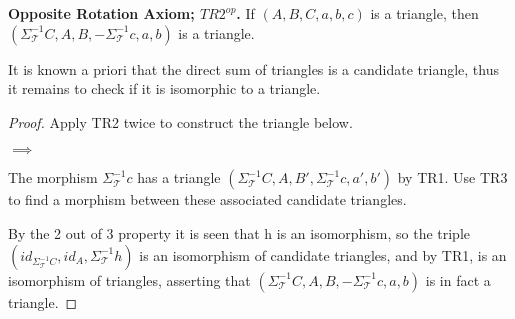     \begin{lemma} \textbf{Opposite Rotation Axiom; $TR2^{op}$.}
        If $(A,B,C,a,b,c)$ is a triangle, then $(\Sigma_{\mathcal{T}}^{-1}C,A,B,-\Sigma_{\mathcal{T}}^{-1}c,a,b)$ is a triangle.
    \end{lemma}

    \begin{remark}
        It is known a priori that the direct sum of triangles is a candidate triangle, thus it remains to check if it is isomorphic to a triangle.
    \end{remark}

    \begin{proof}
        Apply TR2 twice to construct the triangle below.
        \begin{center}
            $\implies$
        \end{center}
        The morphism $\Sigma_{\mathcal{T}}^{-1}c$ has a triangle $(\Sigma_{\mathcal{T}}^{-1}C,A,B',\Sigma_{\mathcal{T}}^{-1}c,a',b')$ by TR1. Use TR3 to find a morphism between these associated candidate triangles.
        \begin{center}
        \end{center}
        By the 2 out of 3 property it is seen that h is an isomorphism, so the triple $(id_{\Sigma_{\mathcal{T}}^{-1}C}, id_A, \Sigma_{\mathcal{T}}^{-1}h)$ is an isomorphism of candidate triangles, and by TR1, is an isomorphism of triangles, asserting that $(\Sigma_{\mathcal{T}}^{-1}C,A,B,-\Sigma_{\mathcal{T}}^{-1}c,a,b)$ is in fact a triangle.
    \end{proof}

